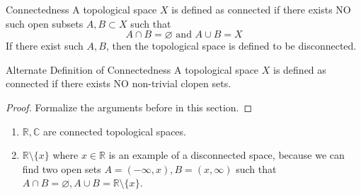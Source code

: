 \begin{Definition}{Connectedness}\label{connectedness}
    A topological space $X$ is defined as connected if there exists NO such open subsets $A, B\subset X$ such that $$A\cap B=\varnothing\text{ and }A\cup B=X$$
    If there exist such $A, B$, then the topological space is defined to be disconnected.
\end{Definition}
\begin{Definition}{Alternate Definition of Connectedness}\label{alternative_connectedness}
    A topological space $X$ is defined as connected if there exists NO non-trivial clopen sets.
\end{Definition}
\begin{proof}
    Formalize the arguments before in this section.
\end{proof}
\begin{Example}
    \begin{enumerate}
        \item $\mathbb{R, C}$ are connected topological spaces.
        \item $\mathbb{R}\setminus\{x\}$ where $x\in\mathbb{R}$ is an example of a disconnected space, because we can find two open sets \newline $A=(-\infty,x),B=(x,\infty)$ such that $A\cap B=\varnothing, A\cup B=\mathbb{R}\setminus\{x\}$. 
    \end{enumerate}
\end{Example}
